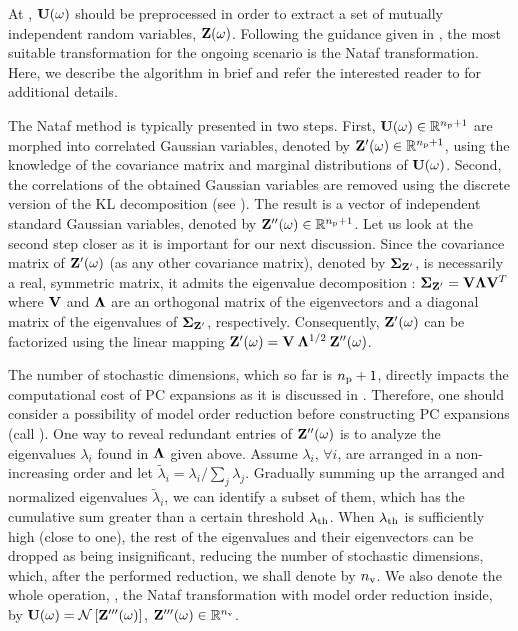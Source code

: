 At , $\mathbf{U}(\omega)$ should be preprocessed in order to extract a set of mutually independent random variables, $\mathbf{Z}(\omega)$.
Following the guidance given in , the most suitable transformation for the ongoing scenario is the Nataf transformation.
Here, we describe the algorithm in brief and refer the interested reader to \cite{li2008} for additional details.

The Nataf method is typically presented in two steps.
First, $\mathbf{U}(\omega) \in \mathbb{R}^{{n_\text{p}} + 1}$ are morphed into correlated Gaussian variables, denoted by $\mathbf{Z}'(\omega) \in \mathbb{R}^{{n_\text{p}} + 1}$, using the knowledge of the covariance matrix and marginal distributions of $\mathbf{U}(\omega)$.
Second, the correlations of the obtained Gaussian variables are removed using the discrete version of the KL decomposition (see ).
The result is a vector of independent standard Gaussian variables, denoted by $\mathbf{Z}''(\omega) \in \mathbb{R}^{{n_\text{p}} + 1}$.
Let us look at the second step closer as it is important for our next discussion.
Since the covariance matrix of $\mathbf{Z}'(\omega)$ (as any other covariance matrix), denoted by $\mCov_{\vZ'}$, is necessarily a real, symmetric matrix, it admits the eigenvalue decomposition \cite{press2007}: $\mCov_{\vZ'} = \m{V} \m{\Lambda} \m{V}^T$ where $\m{V}$ and $\m{\Lambda}$ are an orthogonal matrix of the eigenvectors and a diagonal matrix of the eigenvalues of $\mCov_{\vZ'}$, respectively.
Consequently, $\mathbf{Z}'(\omega)$ can be factorized using the linear mapping $\vZ'(\o) = \m{V} \: \m{\Lambda}^{1/2} \: \vZ''(\o)$.

The number of stochastic dimensions, which so far is ${n_\text{p}} + 1$, directly impacts the computational cost of PC expansions as it is discussed in .
Therefore, one should consider a possibility of model order reduction before constructing PC expansions (call ).
One way to reveal redundant entries of $\mathbf{Z}''(\omega)$ is to analyze the eigenvalues $\lambda_i$ found in $\m{\Lambda}$ given above.
Assume $\lambda_i$, $\forall i$, are arranged in a non-increasing order and let $\tilde{\lambda}_i = \lambda_i / \sum_j \lambda_j$.
Gradually summing up the arranged and normalized eigenvalues $\tilde{\lambda}_i$, we can identify a subset of them, which has the cumulative sum greater than a certain threshold $\lambda_\text{th}$.
When $\lambda_\text{th}$ is sufficiently high (close to one), the rest of the eigenvalues and their eigenvectors can be dropped as being insignificant, reducing the number of stochastic dimensions, which, after the performed reduction, we shall denote by ${n_\text{v}}$.
We also denote the whole operation, \ie, the Nataf transformation with model order reduction inside, by $\mathbf{U}(\omega) = \mathcal{N}\left[\mathbf{Z}'''(\omega)\right]$, $\mathbf{Z}'''(\omega) \in \mathbb{R}^{n_\text{v}}$.

